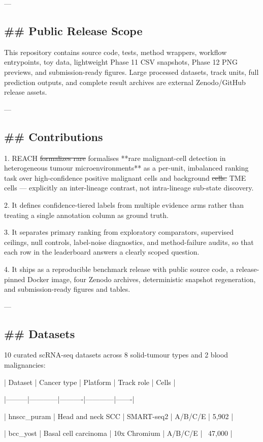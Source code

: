 \documentclass[11pt]{article}
\newcommand{\added}[1]{{\color{trackred}#1}}
\newcommand{\deleted}[1]{{\color{trackred}\sout{#1}}}
\begin{document}
---

\subsection*{\#\# Public Release Scope}
This repository contains source code, tests, method wrappers, workflow entrypoints, toy data, lightweight Phase 11 CSV snapshots, Phase 12 PNG previews, and submission-ready figures. Large processed datasets, track units, full prediction outputs, and complete result archives are external Zenodo/GitHub release assets.

---

\subsection*{\#\# Contributions}
1. REACH \deleted{formalizes rare} \added{formalises **rare} malignant-cell detection \added{in heterogeneous tumour microenvironments**} as a per-unit, imbalanced ranking task over high-confidence positive \added{malignant cells} and background \deleted{cells.} \added{TME cells — explicitly an inter-lineage contrast, not intra-lineage sub-state discovery.}

2. It defines confidence-tiered labels from multiple evidence arms rather than treating a single annotation column as ground truth.

3. It separates primary ranking from exploratory comparators, supervised ceilings, null controls, label-noise diagnostics, and method-failure audits, so that each row in the leaderboard answers a clearly scoped question.

4. It ships as a reproducible benchmark release with public source code, a release-pinned Docker image, four Zenodo archives, deterministic snapshot regeneration, and submission-ready figures and tables.

---

\subsection*{\#\# Datasets}
10 curated scRNA-seq datasets across 8 solid-tumour types and 2 blood malignancies:

| Dataset | Cancer type | Platform | Track role | Cells |

|---------|------------|----------|------------|-------|

| hnscc\_puram | Head and neck SCC | SMART-seq2 | A/B/C/E | 5,902 |

| bcc\_yost | Basal cell carcinoma | 10x Chromium | A/B/C/E | ~47,000 |
\end{document}
